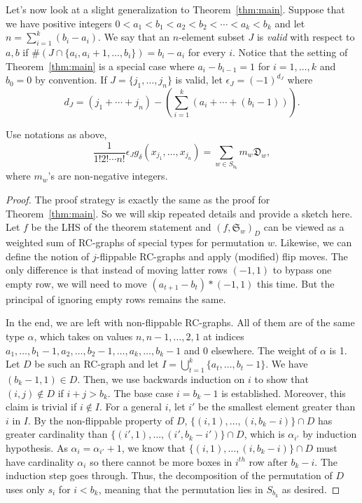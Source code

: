 \documentclass[ALCO,ThmDefs,Unicode,epreuves]{cedram}
\newcommand{\D}{\mathfrak{D}}
\begin{document}
Let's now look at a slight generalization to Theorem~\ref{thm:main}. Suppose that we have positive integers $0<a_1<b_1<a_2<b_2<\cdots<a_k<b_k$ and let $n=\sum_{i=1}^k(b_i-a_i)$. We say that an $n$-element subset $J$ is \emph{valid} with respect to $a,b$ if $\#(J\cap \{a_i,a_i+1,\ldots,b_i\})=b_i-a_i$ for every $i$. Notice that the setting of Theorem~\ref{thm:main} is a special case where $a_{i}-b_{i-1}=1$ for $i=1,\ldots,k$ and $b_{0}=0$ by convention. If $J=\{j_1,\ldots,j_n\}$ is valid, let $\epsilon_J=(-1)^{d_J}$ where 
\[
d_J=(j_1+\cdots+j_n)-\left(\sum_{i=1}^k(a_i+\cdots+(b_i-1))\right).
\]

\begin{theorem}\label{thm:gen}
Use notations as above, 
\[
\frac{1}{1!2!\cdots n!}\epsilon_Jg_{\delta}(x_{j_1},\ldots,x_{j_n})=\sum_{w\in S_{b_k}}m_w\D_w,
\]
where $m_w$'s are non-negative integers.
\end{theorem}
\begin{proof}
The proof strategy is exactly the same as the proof for Theorem~\ref{thm:main}. So we will skip repeated details and provide a sketch here. Let $f$ be the LHS of the theorem statement and $(f,\mathfrak{S}_w)_D$ can be viewed as a weighted sum of RC-graphs of special types for permutation $w$. Likewise, we can define the notion of $j$-flippable RC-graphs and apply (modified) flip moves. The only difference is that instead of moving latter rows $(-1,1)$ to bypass one empty row, we will need to move $(a_{t+1}-b_t)*(-1,1)$ this time. But the principal of ignoring empty rows remains the same. 

In the end, we are left with non-flippable RC-graphs. All of them are of the same type $\alpha$, which takes on values $n,n-1,\ldots,2,1$ at indices $a_1,\ldots,b_1-1,a_2,\ldots,b_2-1,\ldots,a_k,\ldots,b_k-1$ and 0 elsewhere. The weight of $\alpha$ is 1. Let $D$ be such an RC-graph and let $I=\bigcup_{t=1}^k\{a_t,\ldots,b_t-1\}$. We have $(b_k-1,1)\in D$. Then, we use backwards induction on $i$ to show that $(i,j)\notin D$ if $i+j>b_k$. The base case $i=b_k-1$ is established. Moreover, this claim is trivial if $i\notin I$. For a general $i$, let $i'$ be the smallest element greater than $i$ in $I$. By the non-flippable property of $D$, $\{(i,1),\ldots,(i,b_k-i)\}\cap D$ has greater cardinality than $\{(i',1),\ldots,(i',b_k-i')\}\cap D$, which is $\alpha_{i'}$ by induction hypothesis. As $\alpha_i=\alpha_{i'}+1$, we know that $\{(i,1),\ldots,(i,b_k-i)\}\cap D$ must have cardinality $\alpha_i$ so there cannot be more boxes in $i^{th}$ row after $b_k-i$. The induction step goes through. Thus, the decomposition of the permutation of $D$ uses only $s_i$ for $i<b_k$, meaning that the permutation lies in $S_{b_k}$ as desired.
\end{proof}




\end{document}
